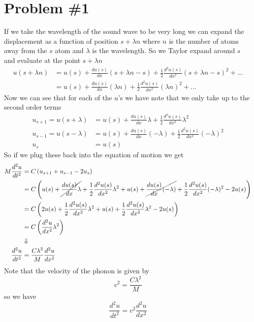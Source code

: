 \documentclass[11pt]{article}
\numberwithin{equation}{section}
\begin{document}


\section{Problem \#1}
If we take the wavelength of the sound wave to be very long we can expand the displacement as a function of position $s+\lambda n$ where $n$ is the number of atoms away from the $s$ atom and $\lambda$ is the wavelength. So we Taylor expand around $s$ and evaluate at the point $s+\lambda n$
\begin{align*}
u(s+\lambda n) &= u(s) + \frac{du(s)}{dx}(s+\lambda n - s) + \frac{1}{2}\frac{d^2u(s)}{dx^2}(s+\lambda n - s)^2 + ...\\
&= u(s) + \frac{du(s)}{dx}(\lambda n) + \frac{1}{2}\frac{d^2u(s)}{dx^2}(\lambda n)^2 + ...
\end{align*}
Now we can see that for each of the $u$'s we have note that we only take up to the second order terms
\begin{align*}
u_{s+1} = u(s+\lambda) &= u(s) + \frac{du(s)}{dx}\lambda + \frac{1}{2}\frac{d^2u(s)}{dx^2}\lambda^2 \\
u_{s-1} = u(s-\lambda) &= u(s) + \frac{du(s)}{dx}(-\lambda) + \frac{1}{2}\frac{d^2u(s)}{dx^2}(-\lambda)^2 \\
u_s &= u(s)
\end{align*}
So if we plug these back into the equation of motion we get
\begin{align*}
M\frac{d^2u}{dt^2} &= C\left(u_{s+1} + u_{s-1} - 2u_s\right)\\
&= C\left(u(s) + \cancel{\frac{du(s)}{dx}\lambda} + \frac{1}{2}\frac{d^2u(s)}{dx^2}\lambda^2 + u(s) + \cancel{\frac{du(s)}{dx}(-\lambda)} + \frac{1}{2}\frac{d^2u(s)}{dx^2}(-\lambda)^2 - 2u(s)\right)\\
&= C\left(2u(s) + \frac{1}{2}\frac{d^2u(s)}{dx^2}\lambda^2 + u(s) + \frac{1}{2}\frac{d^2u(s)}{dx^2}\lambda^2 - 2u(s)\right)\\
&= C\left(\frac{d^2u}{dx^2}\lambda^2\right) \\
&\Downarrow\\
\frac{d^2u}{dt^2} &= \frac{C\lambda^2}{M}\frac{d^2u}{dx^2}
\end{align*}
Note that the velocity of the phonon is given by
$$ v^2 = \frac{C\lambda^2}{M}$$
so we have
$$\frac{d^2u}{dt^2} = v^2\frac{d^2u}{dx^2}$$
\end{document}
